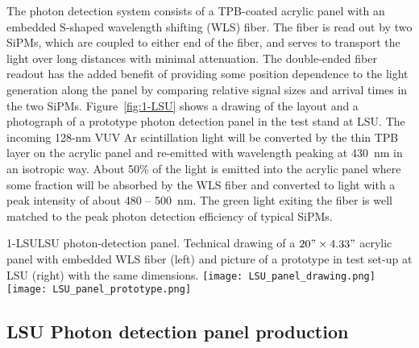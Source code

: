 The photon detection system consists of a TPB-coated acrylic panel
with an embedded S-shaped wavelength shifting (WLS) fiber. The fiber
is read out by two SiPMs, which are coupled to either end of the fiber,
and serves to transport the light over long distances with minimal
attenuation. The double-ended fiber readout has the added benefit of
providing some position dependence to the light generation along the
panel by comparing relative signal sizes and arrival times in the two
SiPMs. Figure~\ref{fig:1-LSU} shows a drawing of the layout and a
photograph of a prototype photon detection panel in the test stand at
LSU.  The incoming 128-nm VUV Ar scintillation light will be converted
by the thin TPB layer on the acrylic panel and re-emitted with
wavelength peaking at 430~nm in an isotropic way. About 50\% of the
light %
is emitted into the acrylic panel where some fraction will
be absorbed by the WLS fiber and converted to light with a peak
intensity of about 480 -- 500~nm. The green light exiting the fiber is
well matched to the peak photon detection efficiency of typical SiPMs.

\begin{cdrfigure}{1-LSU}{LSU photon-detection panel. Technical drawing of a $20"\times4.33"$ acrylic panel with embedded WLS fiber (left) and picture of a prototype in test set-up at LSU (right) with the same dimensions.}
\texttt{[image: LSU\_panel\_drawing.png]}
\texttt{[image: LSU\_panel\_prototype.png]}
\end{cdrfigure}


\subsection{LSU Photon detection panel production}


